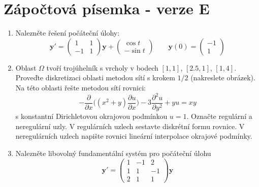 \documentclass[a4paper,10pt]{article}
\def\vc#1{\mathbf{\boldsymbol{#1}}}     %
\def\prtl{\partial}                                        %
\begin{document}
\section*{Zápočtová písemka - verze E}
\begin{enumerate}
 \item 
   Nalezněte řešení počáteční úlohy:
   \[
    \vc y'=\begin{pmatrix}
          1 & 1 \\ -1 & 1
       \end{pmatrix} \vc y
       +
       \begin{pmatrix}
         \cos t \\ -\sin t
       \end{pmatrix}
    \qquad
    \vc y(0)=\begin{pmatrix}
           -1 \\ 1
         \end{pmatrix}
   \]
 \item 
   Oblast $\Omega$ tvoří trojúhelník s vrcholy v bodech $[1,1]$, $[2.5, 1]$, $[1,4]$. Proveďte diskretizaci 
   oblasti metodou sítí s krokem $1/2$ (nakreslete obrázek). Na této oblasti řešte metodou sítí rovnici:
   \[
      -\frac{\prtl}{\prtl x}\big( (x^2+y)\frac{\prtl u}{\prtl x}\big) - 3 \frac{\prtl^2 u}{\prtl y^2} + yu= xy
   \]
   s konstantní Dirichletovou okrajovou podmínkou $u = 1$.
   Označte regulární a neregulární uzly. V regulárních uzlech sestavte diskrétní formu rovnice. V neregulárních 
   uzlech napište rovnici lineární interpolace okrajové podmínky.
      
 \item
    Nalezněte libovolný fundamentální systém pro počáteční úlohu
    \[
    \vc y'=\begin{pmatrix}
          1 & -1 & 2 \\ 
          1 & 1 & -1 \\
          2 & 1 & 1
       \end{pmatrix} \vc y   
    \]
\end{enumerate}
\pagebreak
\end{document}
